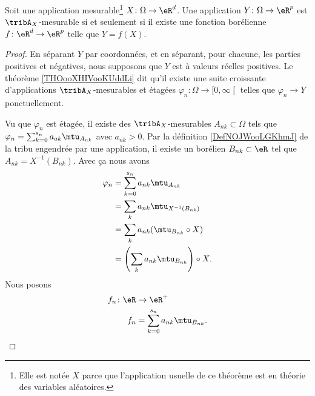 \begin{theorem}     \label{ThofrestemesurablesXYYX}
    Soit une application mesurable\footnote{Elle est notée \( X\) parce que l'application usuelle de ce théorème est en théorie des variables aléatoires.} \( X\colon \Omega\to \eR^d\). Une application \( Y\colon \Omega\to \eR^{p}\) est \( \tribA_X\)-mesurable si et seulement si il existe une fonction borélienne \( f\colon \eR^d\to \eR^{p}\) telle que \( Y=f(X)\).
\end{theorem}

\begin{proof}
En séparant \( Y\) par coordonnées, et en séparant, pour chacune, les parties positives et négatives, nous supposons que \( Y\) est à valeurs réelles positives. Le théorème \ref{THOooXHIVooKUddLi} dit qu'il existe une suite croissante d'applications \( \tribA_X\)-mesurables et étagées \( \varphi_n\colon \Omega\to \mathopen[ 0 , \infty \mathclose[\) telles que \( \varphi_n\to Y\) ponctuellement.

    Vu que \( \varphi_n\) est étagée, il existe des \( \tribA_X\)-mesurables \( A_{nk}\subset \Omega\) tels que \( \varphi_n=\sum_{k=0}^{s_n}a_{ak}\mtu_{A_{nk}}\) avec \( a_{nk}>0\).  Par la définition \ref{DefNOJWooLGKhmJ} de la tribu engendrée par une application, il existe un borélien \( B_{nk}\subset \eR\) tel que \( A_{nk}=X^{-1}(B_{nk})\). Avec ça nous avons
    \begin{subequations}
        \begin{align}
            \varphi_n&=\sum_{k=0}^{s_n}a_{nk}\mtu_{A_{nk}}\\
            &=\sum_ka_{nk}\mtu_{X^{-1}(B_{nk})}\\
            &=\sum_ka_{nk}(\mtu_{B_{nk}}\circ X)\\
            &=\left( \sum_ka_{nk}\mtu_{B_{nk}} \right)\circ X.
        \end{align}
    \end{subequations}
    Nous posons
    \begin{equation}
        \begin{aligned}
            f_n\colon \eR&\to \eR^+ \\
            f_n&=\sum_{k=0}^{s_n}a_{nk}\mtu_{B_{nk}}.
        \end{aligned}
    \end{equation}
    

\end{proof}
